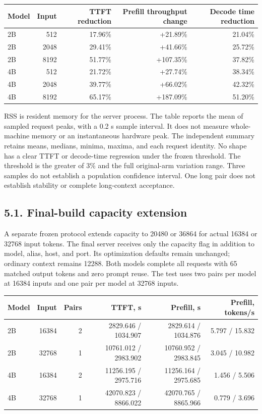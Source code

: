 \documentclass[10pt,a4paper]{article}
\begin{document}
\begin{longtable}[]{@{}lrrrr@{}}
\toprule
Model & Input & TTFT reduction & Prefill throughput change & Decode time
reduction\tabularnewline
\midrule
\endhead
2B & 512 & 17.96\% & +21.89\% & 21.04\%\tabularnewline
2B & 2048 & 29.41\% & +41.66\% & 25.72\%\tabularnewline
2B & 8192 & 51.77\% & +107.35\% & 37.82\%\tabularnewline
4B & 512 & 21.72\% & +27.74\% & 38.34\%\tabularnewline
4B & 2048 & 39.77\% & +66.02\% & 42.32\%\tabularnewline
4B & 8192 & 65.17\% & +187.09\% & 51.20\%\tabularnewline
\bottomrule
\end{longtable}

RSS is resident memory for the server process. The table reports the
mean of sampled request peaks, with a 0.2 s sample interval. It does not
measure whole-machine memory or an instantaneous hardware peak. The
independent summary retains means, medians, minima, maxima, and each
request identity. No shape has a clear TTFT or decode-time regression
under the frozen threshold. The threshold is the greater of 3\% and the
full original-arm variation range. Three samples do not establish a
population confidence interval. One long pair does not establish
stability or complete long-context acceptance.

\hypertarget{final-build-capacity-extension}{%
\subsection{5.1. Final-build capacity
extension}\label{final-build-capacity-extension}}

A separate frozen protocol extends capacity to 20480 or 36864 for actual
16384 or 32768 input tokens. The final server receives only the capacity
flag in addition to model, alias, host, and port. Its optimization
defaults remain unchanged; ordinary context remains 12288. Both models
complete all requests with 65 matched output tokens and zero prompt
reuse. The test uses two pairs per model at 16384 inputs and one pair
per model at 32768 inputs.

\begin{longtable}[]{@{}lrrrrr@{}}
\toprule
Model & Input & Pairs & TTFT, s & Prefill, s & Prefill,
tokens/s\tabularnewline
\midrule
\endhead
2B & 16384 & 2 & 2829.646 / 1034.907 & 2829.614 / 1034.876 & 5.797 /
15.832\tabularnewline
2B & 32768 & 1 & 10761.012 / 2983.902 & 10760.952 / 2983.845 & 3.045 /
10.982\tabularnewline
4B & 16384 & 2 & 11256.195 / 2975.716 & 11256.164 / 2975.685 & 1.456 /
5.506\tabularnewline
4B & 32768 & 1 & 42070.823 / 8866.022 & 42070.765 / 8865.966 & 0.779 /
3.696\tabularnewline
\bottomrule
\end{longtable}
\end{document}

